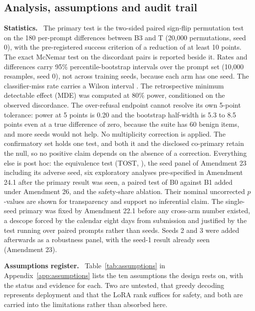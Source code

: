 \documentclass[10pt]{article} %
\newcommand{\Bz}{B0}
\newcommand{\Bo}{B1}
\newcommand{\Bth}{B3}
\newcommand{\T}{T}
\newcommand{\lead}[1]{\textbf{#1}\ }
\begin{document}
\subsection{Analysis, assumptions and audit trail}
\label{sec:audit}
\lead{Statistics.} The primary test is the two-sided paired sign-flip permutation test on the 180 per-prompt differences between \Bth{} and \T{} (20,000 permutations, seed 0), with the pre-registered success criterion of a reduction of at least 10 points. The exact McNemar test on the discordant pairs \citep{mcnemar1947note} is reported beside it. Rates and differences carry 95\% percentile-bootstrap intervals over the prompt set (10,000 resamples, seed 0), not across training seeds, because each arm has one seed. The classifier-miss rate carries a Wilson interval \citep{wilson1927probable}. The retrospective minimum detectable effect (MDE) was computed at 80\% power, conditioned on the observed discordance. The over-refusal endpoint cannot resolve its own 5-point tolerance: power at 5 points is 0.20 and the bootstrap half-width is 5.3 to 8.5 points even at a true difference of zero, because the suite has 60 benign items, and more seeds would not help. No multiplicity correction is applied. The confirmatory set holds one test, and both it and the disclosed co-primary retain the null, so no positive claim depends on the absence of a correction. Everything else is post hoc: the equivalence test (TOST, \citealp{schuirmann1987comparison}), the seed panel of Amendment 23 including its adverse seed, six exploratory analyses pre-specified in Amendment 24.1 after the primary result was seen, a paired test of \Bz{} against \Bo{} added under Amendment 26, and the safety-share ablation. Their nominal uncorrected $p$-values are shown for transparency and support no inferential claim. The single-seed primary was fixed by Amendment 22.1 before any cross-arm number existed, a descope forced by the calendar eight days from submission and justified by the test running over paired prompts rather than seeds. Seeds 2 and 3 were added afterwards as a robustness panel, with the seed-1 result already seen (Amendment 23).

\lead{Assumptions register.} Table~\ref{tab:assumptions} in Appendix~\ref{app:assumptions} lists the ten assumptions the design rests on, with the status and evidence for each. Two are untested, that greedy decoding represents deployment and that the LoRA rank suffices for safety, and both are carried into the limitations rather than absorbed here.
\end{document}
